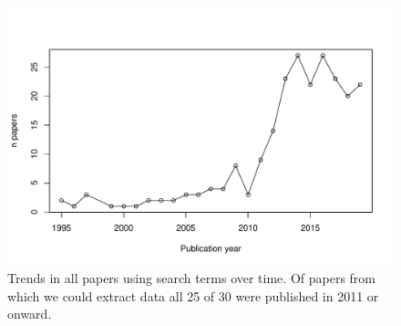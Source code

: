 \documentclass[11pt,letter]{article}
\begin{document}
\clearpage
\begin{figure}[t!]
\centering
\includegraphics[width=1\textwidth]{..//..//..//R/graphs/otherdat/papersovertime.pdf}
\caption{Trends in all papers using search terms over time. Of papers from which we could extract data all 25 of 30 were published in 2011 or onward.}
  \label{fig:papertrends}
\end{figure}
\end{document}
